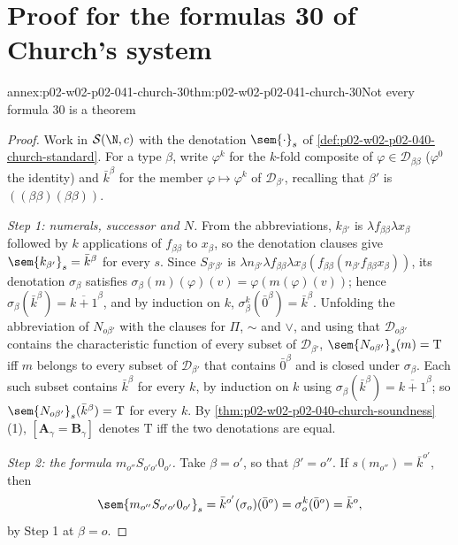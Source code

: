 \section{Proof for the formulas 30 of Church's system}
\label{sec:annex-p02-w02-p02-041-church}

\begin{annexitem}{annex:p02-w02-p02-041-church-30}{thm:p02-w02-p02-041-church-30}{Not every formula 30 is a theorem}
\begin{proof}
Work in \(\mathcal S(\N,c)\) with the denotation \(\sem{\cdot}_s\) of
\cref{def:p02-w02-p02-040-church-standard}.  For a type \(\beta\), write
\(\varphi^k\) for the \(k\)-fold composite of
\(\varphi\in\mathcal D_{\beta\beta}\) (\(\varphi^0\) the identity) and
\(\bar k^{\beta}\) for the member \(\varphi\mapsto\varphi^k\) of
\(\mathcal D_{\beta'}\), recalling that \(\beta'\) is
\(((\beta\beta)(\beta\beta))\).

\emph{Step 1: numerals, successor and \(N\).}  From the abbreviations,
\(k_{\beta'}\) is \(\lambda f_{\beta\beta}\lambda x_\beta\) followed by \(k\)
applications of \(f_{\beta\beta}\) to \(x_\beta\), so the denotation clauses
give \(\sem{k_{\beta'}}_s=\bar k^\beta\) for every \(s\).  Since
\(S_{\beta'\beta'}\) is
\(\lambda n_{\beta'}\lambda f_{\beta\beta}\lambda x_\beta(f_{\beta\beta}(n_{\beta'}f_{\beta\beta}x_\beta))\),
its denotation \(\sigma_\beta\) satisfies
\(\sigma_\beta(m)(\varphi)(v)=\varphi(m(\varphi)(v))\); hence
\(\sigma_\beta(\bar k^\beta)=\overline{k+1}^\beta\), and by induction on \(k\),
\(\sigma_\beta^k(\bar0^\beta)=\bar k^\beta\).  Unfolding the abbreviation of
\(N_{o\beta'}\) with the clauses for \(\Pi\), \(\sim\) and \(\vee\), and using
that \(\mathcal D_{o\beta'}\) contains the characteristic function of every
subset of \(\mathcal D_{\beta'}\), \(\sem{N_{o\beta'}}_s(m)=\mathrm T\) iff
\(m\) belongs to every subset of \(\mathcal D_{\beta'}\) that contains
\(\bar0^\beta\) and is closed under \(\sigma_\beta\).  Each such subset
contains \(\bar k^\beta\) for every \(k\), by induction on \(k\) using
\(\sigma_\beta(\bar k^\beta)=\overline{k+1}^\beta\); so
\(\sem{N_{o\beta'}}_s(\bar k^\beta)=\mathrm T\) for every \(k\).  By
\cref{thm:p02-w02-p02-040-church-soundness}(1),
\([\mathbf A_\gamma=\mathbf B_\gamma]\) denotes \(\mathrm T\) iff the two
denotations are equal.

\emph{Step 2: the formula \(m_{o''}S_{o'o'}0_{o'}\).}  Take \(\beta=o'\), so
that \(\beta'=o''\).  If \(s(m_{o''})=\bar k^{o'}\), then
\[
 \sem{m_{o''}S_{o'o'}0_{o'}}_s
 =\bar k^{o'}(\sigma_o)(\bar0^o)
 =\sigma_o^k(\bar0^o)
 =\bar k^{o},
\]
by Step 1 at \(\beta=o\).


\end{proof}
\end{annexitem}
